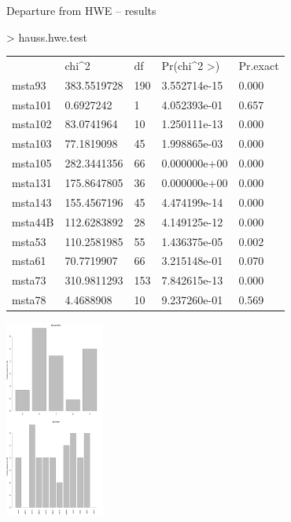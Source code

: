 \documentclass[compress, ucs, xelatex, 11pt, xcolor=svgnames,
  hyperref={
    bookmarks=true,
    unicode=true,
    colorlinks=true,
    pdftitle={Molecular data in R},
    plainpages=false,
    pdfauthor={Vojtech Zeisek},
    pdfsubject={Course about phylogeny and evolution in R},
    pdfcreator={XeLaTeX},
    pdfkeywords={R, evolution, phylogeny, molecular data},
    linkcolor=Tomato,
    anchorcolor=SaddleBrown,
    citecolor=Goldenrod,
    filecolor=DarkMagenta,
    menucolor=Sienna,
    urlcolor=DarkTurquoise,
    pdftex},
  url={hyphens, lowtilde} %
  ]{beamer}
\begin{document}
\begin{frame}[fragile]{Departure from HWE -- results}
  \begin{multicols}{2}
    \begin{footnotesize}
      > hauss.hwe.test
      \begin{tabular}{lllll}
	& chi\textasciicircum2 & df & Pr(chi\textasciicircum2 >) & Pr.exact\\
	msta93 & 383.5519728 & 190 & 3.552714e-15 & 0.000\\
	msta101 & 0.6927242 & 1 & 4.052393e-01 & 0.657\\
	msta102 & 83.0741964 & 10 & 1.250111e-13 & 0.000\\
	msta103 & 77.1819098 & 45 & 1.998865e-03 & 0.000\\
	msta105 & 282.3441356 & 66 & 0.000000e+00 & 0.000\\
	msta131 & 175.8647805 & 36 & 0.000000e+00 & 0.000\\
	msta143 & 155.4567196 & 45 & 4.474199e-14 & 0.000\\
	msta44B & 112.6283892 & 28 & 4.149125e-12 & 0.000\\
	msta53 & 110.2581985 & 55 & 1.436375e-05 & 0.002\\
	msta61 & 70.7719907 & 66 & 3.215148e-01 & 0.070\\
	msta73 & 310.9811293 & 153 & 7.842615e-13 & 0.000\\
	msta78 & 4.4688908 & 10 & 9.237260e-01 & 0.569
      \end{tabular}
    \end{footnotesize}
    \begin{flushright}
      \includegraphics[height=6.5cm]{hwe.png}
    \end{flushright}
  \end{multicols}
\end{frame}
\end{document}
